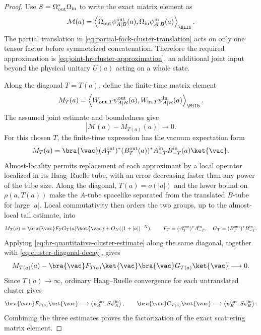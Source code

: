 \begin{proof}
Use \(S=\Omega_{\rm out}^*\Omega_{\rm in}\) to write the exact matrix element
as
\[
  \mathcal M(a)
  =
  \left\langle
    \Omega_{\rm out}\psi_{A|B}^{\rm out}(a),
    \Omega_{\rm in}\psi_{A|B}^{\rm in}(a)
  \right\rangle_{\Hilb}.
\]
The partial translation in
\eqref{eq:partial-fock-cluster-translation} acts on only one tensor factor
before symmetrized concatenation.  Therefore the required approximation is
\eqref{eq:joint-hr-cluster-approximation}, an additional joint input beyond
the physical unitary \(U(a)\) acting on a whole state.

Along the diagonal \(T=T(a)\), define the finite-time matrix element
\[
  M_T(a)
  =
  \left\langle
    W_{{\rm out},T}\psi_{A|B}^{\rm out}(a),
    W_{{\rm in},T}\psi_{A|B}^{\rm in}(a)
  \right\rangle_{\Hilb}.
\]
The assumed joint estimate and boundedness give
\[
  |\mathcal M(a)-M_{T(a)}(a)|
  \longrightarrow0 .
\]
For this chosen \(T\), the finite-time expression has the vacuum expectation
form
\[
  M_T(a)
  =
  \bra{\vac}
    (A_T^{\mathrm{out}})^*
    (B_T^{\mathrm{out}}(a))^*
    A_{-T}^{\mathrm{in}}
    B_{-T}^{\mathrm{in}}(a)
  \ket{\vac}.
\]
Almost-locality permits replacement of each approximant by a local operator
localized in its Haag--Ruelle tube, with an error decreasing faster than any
power of the tube size.  Along the diagonal, \(T(a)=o(|a|)\) and the lower
bound on \(\rho(a,T(a))\) make the \(A\)-tube spacelike separated from the
translated \(B\)-tube for large \(|a|\).  Local commutativity then orders the
two groups, up to the almost-local tail estimate, into
\[
  M_T(a)
  =
  \bra{\vac}F_TG_T(a)\ket{\vac}
  +
  O_N((1+|a|)^{-N}),
  \qquad
  F_T=(A_T^{\mathrm{out}})^*A_{-T}^{\mathrm{in}},
  \quad
  G_T=(B_T^{\mathrm{out}})^*B_{-T}^{\mathrm{in}} .
\]
Applying \eqref{eq:hr-quantitative-cluster-estimate} along the same diagonal,
together with \eqref{eq:cluster-diagonal-decay}, gives
\[
  M_{T(a)}(a)
  -
  \bra{\vac}F_{T(a)}\ket{\vac}\bra{\vac}G_{T(a)}\ket{\vac}
  \longrightarrow0 .
\]
Since \(T(a)\to\infty\), ordinary Haag--Ruelle convergence for each
untranslated cluster gives
\[
  \bra{\vac}F_{T(a)}\ket{\vac}
  \longrightarrow
  \left\langle\psi_A^{\mathrm{out}},S\psi_A^{\mathrm{in}}\right\rangle,
  \qquad
  \bra{\vac}G_{T(a)}\ket{\vac}
  \longrightarrow
  \left\langle\psi_B^{\mathrm{out}},S\psi_B^{\mathrm{in}}\right\rangle .
\]
Combining the three estimates proves the factorization of the exact scattering
matrix element.
\end{proof}

